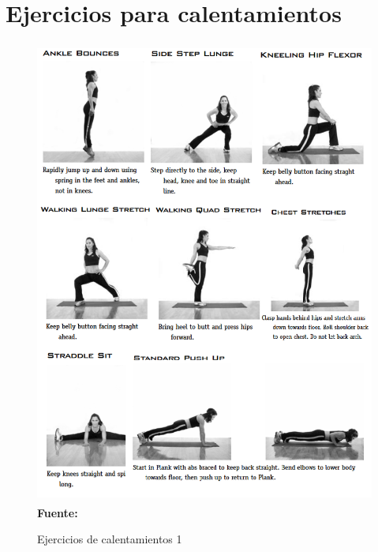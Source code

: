 \section{Ejercicios para calentamientos} \label{anx:warmup}
\begin{figure}[H]
	\caption{Ejercicios de calentamientos 1}
	\label{fig:anxWarmup1}
	\centering
	\includegraphics[width=430px,height=580px]{graphics/warmup1.PNG} \\
	\textbf{Fuente:} 
\end{figure}

